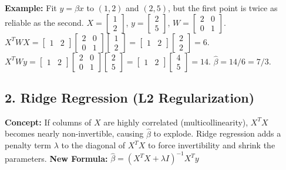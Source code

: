 \documentclass[11pt, letterpaper]{article}
\theoremstyle{definition}
\theoremstyle{remark}
\begin{document}
\textbf{Example:} Fit $y = \beta x$ to $(1, 2)$ and $(2, 5)$, but the first point is twice as reliable as the second.
$X = \begin{bmatrix} 1 \\ 2 \end{bmatrix}$, $y = \begin{bmatrix} 2 \\ 5 \end{bmatrix}$, $W = \begin{bmatrix} 2 & 0 \\ 0 & 1 \end{bmatrix}$.
$X^T W X = \begin{bmatrix} 1 & 2 \end{bmatrix} \begin{bmatrix} 2 & 0 \\ 0 & 1 \end{bmatrix} \begin{bmatrix} 1 \\ 2 \end{bmatrix} = \begin{bmatrix} 1 & 2 \end{bmatrix} \begin{bmatrix} 2 \\ 2 \end{bmatrix} = 6$.
$X^T W y = \begin{bmatrix} 1 & 2 \end{bmatrix} \begin{bmatrix} 2 & 0 \\ 0 & 1 \end{bmatrix} \begin{bmatrix} 2 \\ 5 \end{bmatrix} = \begin{bmatrix} 1 & 2 \end{bmatrix} \begin{bmatrix} 4 \\ 5 \end{bmatrix} = 14$.
$\hat{\beta} = 14 / 6 = 7/3$.

\subsection{2. Ridge Regression (L2 Regularization)}
\textbf{Concept:} If columns of $X$ are highly correlated (multicollinearity), $X^T X$ becomes nearly non-invertible, causing $\hat{\beta}$ to explode. Ridge regression adds a penalty term $\lambda$ to the diagonal of $X^T X$ to force invertibility and shrink the parameters.
\textbf{New Formula:} $\hat{\beta} = (X^T X + \lambda I)^{-1} X^T y$
\end{document}
